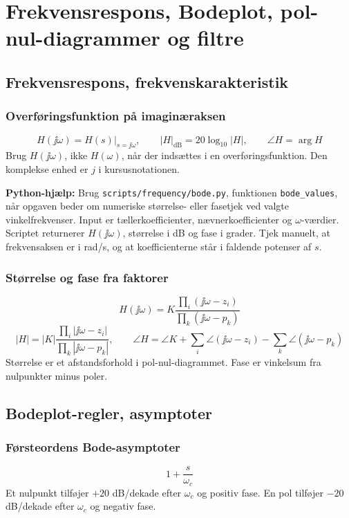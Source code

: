 \section{Frekvensrespons, Bodeplot, pol-nul-diagrammer og filtre}

\subsection{Frekvensrespons, frekvenskarakteristik}

\subsubsection{Overføringsfunktion på imaginæraksen}
\[
H(\jj\omega)=H(s)\big|_{s=\jj\omega},\qquad
|H|_{\mathrm{dB}}=20\log_{10}|H|,\qquad
\angle H=\arg H
\]
Brug \(H(\jj\omega)\), ikke \(H(\omega)\), når der indsættes i en overføringsfunktion. Den komplekse enhed er \(j\) i kursusnotationen.

\textbf{Python-hjælp:} Brug \texttt{scripts/frequency/bode.py}, funktionen \texttt{bode\_values}, når opgaven beder om numeriske størrelse- eller fasetjek ved valgte vinkelfrekvenser. Input er tællerkoefficienter, nævnerkoefficienter og \(\omega\)-værdier. Scriptet returnerer \(H(\jj\omega)\), størrelse i dB og fase i grader. Tjek manuelt, at frekvensaksen er i rad/s, og at koefficienterne står i faldende potenser af \(s\).

\subsubsection{Størrelse og fase fra faktorer}
\[
H(\jj\omega)=K\frac{\prod_i(\jj\omega-z_i)}{\prod_k(\jj\omega-p_k)}
\]
\[
|H|=|K|\frac{\prod_i|\jj\omega-z_i|}{\prod_k|\jj\omega-p_k|},\qquad
\angle H=\angle K+\sum_i\angle(\jj\omega-z_i)-\sum_k\angle(\jj\omega-p_k)
\]
Størrelse er et afstandsforhold i pol-nul-diagrammet. Fase er vinkelsum fra nulpunkter minus poler.

\subsection{Bodeplot-regler, asymptoter}

\subsubsection{Førsteordens Bode-asymptoter}
\[
1+\frac{s}{\omega_c}
\]
Et nulpunkt tilføjer \(+20\) dB/dekade efter \(\omega_c\) og positiv fase. En pol tilføjer \(-20\) dB/dekade efter \(\omega_c\) og negativ fase.

